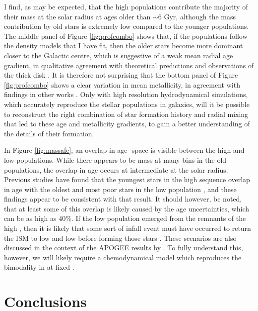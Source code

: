 I find, as may be expected, that the high \afe{} populations contribute the majority of their mass at the solar radius at ages older than $\sim 6$ Gyr, although the mass contribution by old stars is extremely low compared to the younger populations. The middle panel of Figure \ref{fig:profcombo} shows that, if the populations follow the density models that I have fit, then the older stars become more dominant closer to the Galactic centre, which is suggestive of a weak mean radial age gradient, in qualitative agreement with theoretical predictions \citep[e.g.][]{2015ApJ...804L...9M} and observations of the thick disk \citep[e.g.][]{2016arXiv160901168M}. It is therefore not surprising that the bottom panel of Figure \ref{fig:profcombo} shows a clear variation in mean metallicity, in agreement with findings in other works \citep[e.g.][]{2012ApJ...746..149C,2016arXiv160804951A,2015ApJ...808..132H}. Only with high resolution hydrodynamical simulations, which accurately reproduce the stellar populations in galaxies, will it be possible to reconstruct the right combination of star formation history and radial mixing that led to these age and metallicity gradients, to gain a better understanding of the details of their formation.

In Figure \ref{fig:massafe}, an overlap in age-\feh{} space is visible between the high and low \afe{} populations. While there appears to be mass at many \feh{} bins in the old populations, the overlap in age occurs at intermediate \feh{} at the solar radius. Previous studies have found that the youngest stars in the high \afe{} sequence overlap in age with the oldest and most \feh{} poor stars in the low \afe{} population \citep[e.g.][]{2013A&A...560A.109H}, and these findings appear to be consistent with that result. It should however, be noted, that at least some of this overlap is likely caused by the age uncertainties, which can be as high as 40\%. If the low \afe{} population emerged from the remnants of the high \afe{}, then it is likely that some sort of infall event must have occurred to return the ISM to low \feh{} and low \afe{} before forming those stars \citep[as expressed by, e.g.,][]{1997ApJ...477..765C}. These scenarios are also discussed in the context of the APOGEE results by \citet{2014ApJ...796...38N}. To fully understand this, however, we will likely require a chemodynamical model which reproduces the bimodality in \afe{} at fixed \feh{}.

\section{Conclusions}
\label{sec:conclusionsa}

